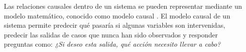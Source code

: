 Las relaciones causales dentro de un sistema se pueden representar mediante un modelo matemático, conocido como modelo causal \cite{sep-causal-models}.
El modelo causal de un sistema
permite predecir qué pasaría si algunas
variables son intervenidas, predecir las salidas de casos que nunca han sido observados \cite{chaochao_2019} y responder preguntas como:
\textit{¿Si deseo esta salida, qué acción necesito
llevar a cabo?}











        

